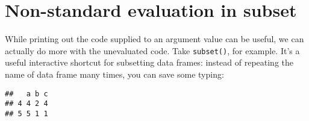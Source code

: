 \begin{enumerate}
\begin{Shaded}
\begin{Highlighting}[]
\StringTok{ }
\StringTok{ }\NormalTok{(}
\NormalTok{(}\OperatorTok{:}\NormalTok{)}
\OperatorTok{+}\StringTok{ }\OperatorTok{^}\StringTok{ } \OperatorTok{/}\StringTok{ }\OperatorTok{+}\StringTok{ }\OperatorTok{*}\StringTok{ }
\end{Highlighting}
\end{Shaded}
\end{enumerate}

\hypertarget{subset}{%
\section{Non-standard evaluation in subset}\label{subset}}

While printing out the code supplied to an argument value can be useful,
we can actually do more with the unevaluated code. Take
\texttt{subset()}, for example. It's a useful interactive shortcut for
subsetting data frames: instead of repeating the name of data frame many
times, you can save some typing: 

\begin{Shaded}
\begin{Highlighting}[]
\StringTok{ }\NormalTok{(} \OperatorTok{:}\NormalTok{, } \OperatorTok{:}\NormalTok{, } \NormalTok{(}\NormalTok{, }\NormalTok{, }\NormalTok{, }\NormalTok{, }\NormalTok{))}

\OperatorTok{>=}\StringTok{ }\NormalTok{)}
\end{Highlighting}
\end{Shaded}

\begin{verbatim}
##   a b c
## 4 4 2 4
## 5 5 1 1
\end{verbatim}

